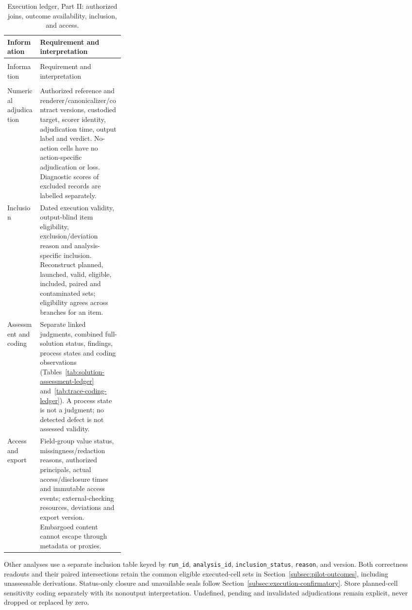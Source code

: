\documentclass[10pt]{article} %
\providecommand{\1}{\mathbf{1}}  %
\theoremstyle{remark}
\theoremstyle{definition}
\begin{document}
\begingroup
\footnotesize
\renewcommand{\arraystretch}{1.13}
\setlength{\LTpre}{6pt}
\setlength{\LTpost}{8pt}
\setlength{\LTcapwidth}{\linewidth}
\begin{longtable}{@{}>{\raggedright\arraybackslash}p{0.28\linewidth}>{\raggedright\arraybackslash}p{}@{}}
\caption{Execution ledger, Part II: authorized joins, outcome availability, inclusion, and access.}\label{tab:execution-evaluation-ledger-b}\\
\toprule
Information & Requirement and interpretation \\
\midrule
\endfirsthead
\multicolumn{2}{@{}l}{\textit{Table \thetable\ continued}}\\
\toprule
Information & Requirement and interpretation \\
\midrule
\endhead
\midrule
\multicolumn{2}{r@{}}{\textit{Continued on next page}}\\
\endfoot
\bottomrule
\endlastfoot

Numerical adjudication & Authorized reference and renderer/canonicalizer/contract versions, custodied target, scorer identity, adjudication time, output label and verdict. No-action cells have no action-specific adjudication or loss. Diagnostic scores of excluded records are labelled separately. \\
Inclusion & Dated execution validity, output-blind item eligibility, exclusion/deviation reason and analysis-specific inclusion. Reconstruct planned, launched, valid, eligible, included, paired and contaminated sets; eligibility agrees across branches for an item. \\
Assessment and coding & Separate linked judgments, combined full-solution status, findings, process states and coding observations (Tables~\ref{tab:solution-assessment-ledger} and~\ref{tab:trace-coding-ledger}). A process state is not a judgment; no detected defect is not assessed validity. \\
Access and export & Field-group value status, missingness/redaction reasons, authorized principals, actual access/disclosure times and immutable access events; external-checking resources, deviations and export version. Embargoed content cannot escape through metadata or proxies. \\
\end{longtable}
\endgroup

Other analyses use a separate inclusion table keyed by
\texttt{run\_id}, \texttt{analysis\_id}, \texttt{inclusion\_status},
\texttt{reason}, and version. Both correctness readouts and their paired intersections retain the common
eligible executed-cell sets in Section~\ref{subsec:pilot-outcomes}, including
unassessable derivations. Status-only closure and unavailable seals follow
Section~\ref{subsec:execution-confirmatory}. Store planned-cell sensitivity
coding separately with its nonoutput interpretation. Undefined, pending and
invalidated adjudications remain explicit, never dropped or replaced by zero.
\end{document}
